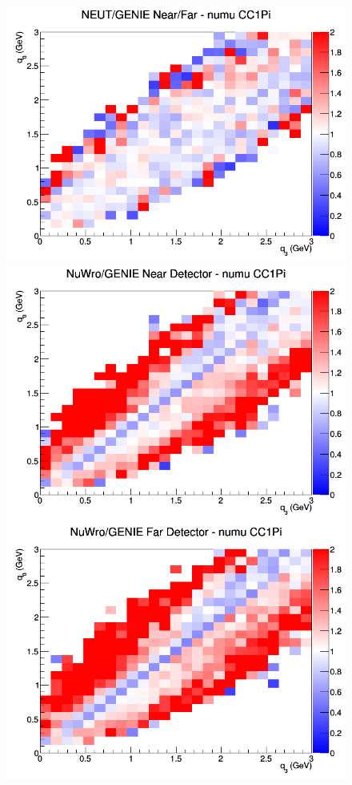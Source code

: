 \documentclass[12pt]{article}
\begin{document}
\begin{figure}[h]
\endminipage
{}
\includegraphics[width=\linewidth]{eff_q0_q3/GAr/ratios/CC1Pi_NEUT_GENIE_numu_NF_q3_q0.png}
\endminipage
\newline
{}
\includegraphics[width=\linewidth]{eff_q0_q3/GAr/ratios/CC1Pi_NuWro_GENIE_numu_near_q3_q0.png}
\endminipage
{}
\includegraphics[width=\linewidth]{eff_q0_q3/GAr/ratios/CC1Pi_NuWro_GENIE_numu_far_q3_q0.png}

\end{figure}
\end{document}
